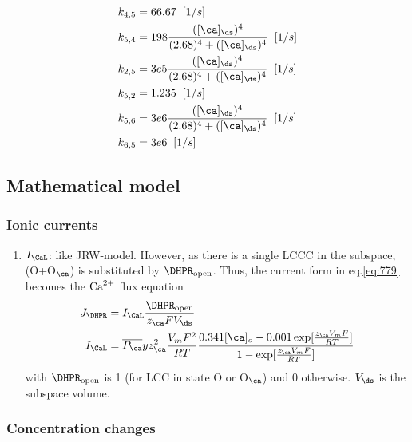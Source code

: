 \begin{equation}
  \label{eq:1306}
  \begin{split}
    k_{4,5}&= 66.67  \;\; [1/s] \\
    k_{5,4} &= 198 \frac{([\ca]_\ds)^4}{(2.68)^4+([\ca]_\ds)^4} \;\;
    [1/s]\\
    k_{2,5} &= 3e5 \frac{([\ca]_\ds)^4}{(2.68)^4+([\ca]_\ds)^4} \;\;
    [1/s]\\ 
    k_{5,2} &=1.235 \;\; [1/s] \\
    k_{5,6} &= 3e6 \frac{([\ca]_\ds)^4}{(2.68)^4+([\ca]_\ds)^4} \;\;
    [1/s]\\
    k_{6,5} &= 3e6 \;\; [1/s]
  \end{split}
\end{equation}


\subsection{Mathematical model}
\label{sec:mathematical-model-17}

\subsubsection{Ionic currents}
\label{sec:ionic-currents-5}

\begin{enumerate}
\item $I_\CaL$: like JRW-model. However, as there is a single LCCC in the
subspace, (O+O$_\ca$) is substituted by $\DHPR_\open$. Thus, the current form in
eq.\ref{eq:779} becomes the ${\text{Ca}^{2+}}$ flux equation
\begin{equation}
\begin{split}
J_\DHPR	 &= %
I_\CaL \frac{\DHPR_\open}{z_\ca F V_\ds} \\
 I_\CaL &= \overline{P_\ca } y z^2_\ca \frac{V_mF^2}{RT}
    \frac{0.341[\ca]_o - 0.001\exp[\frac{z_\ca V_mF}{RT}]}{ 1-
      \exp[\frac{z_\ca V_mF}{RT}]}
\end{split}
\end{equation}
with $\DHPR_\open$ is 1 (for LCC in state O or O$_\ca$) and 0 otherwise. $V_\ds$
is the subspace volume. 


\end{enumerate}

\subsubsection{Concentration changes}
\label{sec:conc-chang}

